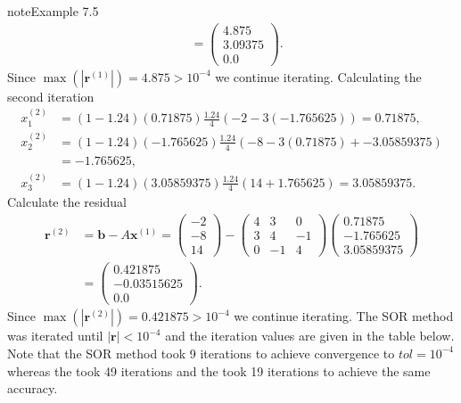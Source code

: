 \documentclass[letterpaper,10pt,english]{jupyterBook}
\begin{document}
\begin{sphinxadmonition}{note}{Example 7.5}
\begin{align*}
    &=
    \begin{pmatrix} 4.875 \\ 3.09375 \\ 0.0 \end{pmatrix}.
\end{align*}
\sphinxAtStartPar
Since \(\max(| \mathbf{r}^{(1)} |) = 4.875 > 10^{-4}\) we continue iterating. Calculating the second iteration
\begin{align*}
    x_{1}^{(2)} &= (1 - 1.24)(0.71875) \frac{1.24}{4} \left( -2 - 3 (-1.765625) \right) = 0.71875, \\
    x_{2}^{(2)} &= (1 - 1.24)(-1.765625) \frac{1.24}{4} \left( -8 - 3 (0.71875) + -3.05859375 \right) \\
    &= -1.765625, \\
    x_{3}^{(2)} &= (1 - 1.24)(3.05859375) \frac{1.24}{4} \left( 14 + 1.765625 \right) = 3.05859375.
\end{align*}
\sphinxAtStartPar
Calculate the residual
\begin{align*}
    \mathbf{r}^{(2)} &= \mathbf{b} - A \mathbf{x}^{(1)} = 
    \begin{pmatrix} -2 \\ -8 \\ 14 \end{pmatrix} -
    \begin{pmatrix} 4 & 3 & 0 \\ 3 & 4 & -1 \\ 0 & -1 & 4 \end{pmatrix}
    \begin{pmatrix} 0.71875 \\ -1.765625 \\ 3.05859375 \end{pmatrix} \\
    &=
    \begin{pmatrix} 0.421875 \\ -0.03515625 \\ 0.0 \end{pmatrix}.
\end{align*}
\sphinxAtStartPar
Since \(\max(| \mathbf{r}^{(2)} |) = 0.421875 > 10^{-4}\) we continue iterating. The SOR method was iterated until \(|\mathbf{r}| < 10^{-4}\) and the iteration values are given in the table below. Note that the SOR method took 9 iterations to achieve convergence to \(tol=10^{-4}\) whereas the {\hyperref[\detokenize{7_Indirect_methods/7.1_Jacobi_method:jacobi-method-example}]{}} took 49 iterations and the {\hyperref[\detokenize{7_Indirect_methods/7.2_Gauss_Seidel_method:gauss-seidel-method-example}]{}} took 19 iterations to achieve the same accuracy.



\end{sphinxadmonition}
\end{document}
